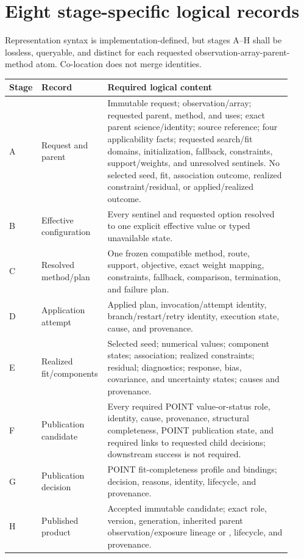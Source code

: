 \documentclass[11pt]{article}
\begin{document}
\section{Eight stage-specific logical records}

Representation syntax is implementation-defined, but stages A--H shall be
lossless, queryable, and distinct for each requested
observation-array-parent-method atom. Co-location does not merge identities.

\begin{longtable}{@{}P{0.07\linewidth}P{0.21\linewidth}P{0.64\linewidth}@{}}
\toprule
Stage & Record & Required logical content \\
\midrule
\endhead
A & Request and parent & Immutable request; observation/array; requested parent, method, and uses; exact parent science/identity; source reference; four applicability facts; requested search/fit domains, initialization, fallback, constraints, support/weights, and unresolved sentinels. No selected seed, fit, association outcome, realized constraint/residual, or applied/realized outcome. \\
B & Effective configuration & Every sentinel and requested option resolved to one explicit effective value or typed unavailable state. \\
C & Resolved method/plan & One frozen compatible method, route, support, objective, exact weight mapping, constraints, fallback, comparison, termination, and failure plan. \\
D & Application attempt & Applied plan, invocation/attempt identity, branch/restart/retry identity, execution state, cause, and provenance. \\
E & Realized fit/components & Selected seed; numerical values; component states; association; realized constraints; residual; diagnostics; response, bias, covariance, and uncertainty states; causes and provenance. \\
F & Publication candidate & Every required POINT value-or-status role, identity, cause, provenance, structural completeness, POINT publication state, and required links to requested child decisions; downstream success is not required. \\
G & Publication decision & POINT fit-completeness profile and bindings; decision, reasons, identity, lifecycle, and provenance. \\
H & Published product & Accepted immutable candidate; exact role, version, generation, inherited parent observation/exposure lineage or , lifecycle, and provenance. \\
\bottomrule
\end{longtable}
\end{document}
